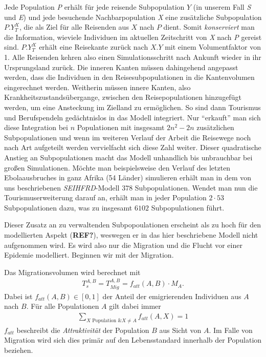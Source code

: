Jede Population \emph{P} erhält für jede reisende Subpopulation $Y$ (in unserem Fall \emph{S} und \emph{E}) und jede besuchende Nachbarpopulation \emph{X} eine zusätzliche Subpopulation $P.Y^X_T$, die als Ziel für alle Reisenden aus $X$ nach $P$ dient. Somit \emph{konserviert} man die Information, wieviele Individuen im aktuellen Zeitschritt von \emph{X} nach \emph{P} gereist sind. $P.Y^X_T$ erhält eine Reisekante zurück nach $X.Y$ mit einem Volumentfaktor von 1. Alle Reisenden kehren also einen Simulationsschritt nach Ankunft wieder in ihr Ursprungsland zurück. Die inneren Kanten müssen dahingehend angepasst werden, dass die Individuen in den Reisesubpopulationen in die Kantenvolumen eingerechnet werden. Weitherin müssen innere Kanten, also Krankheitszustandsübergange, zwischen den Reisepopulationen hinzugefügt werden, um eine Ansteckung im Zielland zu ermöglichen. So sind dann Tourismus und Berufspendeln gedächtnislos in das Modell integriert. Nur ``erkauft'' man sich diese Integration bei $n$ Populationen mit insgesamt $2n^2-2n$ zusätzlichen Subpopulationen und wenn im weiteren Verlauf der Arbeit die Reisewege noch nach Art aufgeteilt werden vervielfacht sich diese Zahl weiter. Dieser quadratische Anstieg an Subpopulationen macht das Modell unhandlich bis unbrauchbar bei großen Simulationen. Möchte man beispielsweise den Verlauf des letzten Ebolaausbruches in ganz Afrika (54 Länder) simulieren erhält man in dem von uns beschriebenen \emph{SEIHFRD}-Modell $378$ Subpopulationen. Wendet man nun die Tourismuserweiterung darauf an, erhält man in jeder Population $2\cdot 53$ Subpopulationen dazu, was zu insgesamt $6102$ Subpopulationen führt. 

Dieser Zusatz an zu verwaltenden Subpopoulationen erscheint als zu hoch für den modellierten Aspekt (\textbf{REF?}), weswegen er in das hier beschriebene Modell nicht aufgenommen wird. Es wird also nur die Migration und die Flucht vor einer Epidemie modelliert. Beginnen wir mit der Migration. 

Das Migrationsvolumen wird berechnet mit
\begin{align}
	T^{A,B}_s=T^{A,B}_{Mig} = f_{att}(A,B)\cdot M_A.
\end{align}
Dabei ist $f_{att}(A,B) \in [0,1]$ der Anteil der emigrierenden Individuen aus $A$ nach $B$. Für alle Populationen $A$ gilt dabei immer
\begin{align}
	\sum\limits_{X \text{ Population } \& X\neq A} f_{att}(A,X) = 1
\end{align}
$f_{att}$ beschreibt die \emph{Attraktivität} der Population $B$ aus Sicht von $A$. Im Falle von Migration wird sich dies primär auf den Lebensstandard innerhalb der Population beziehen. 

